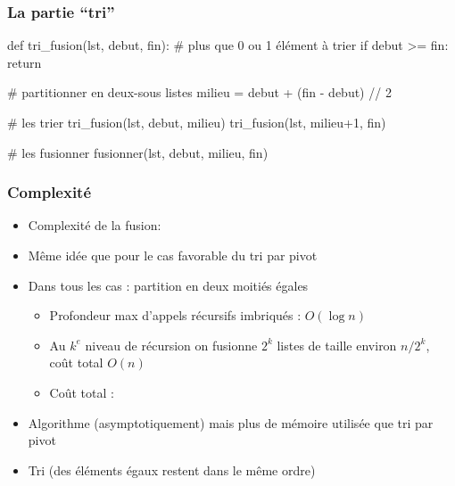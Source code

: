 \documentclass[12pt]{linfo-beamer}
\begin{document}
\begin{frame}[fragile]
\frametitle{La partie ``tri''}

\footnotesize
\begin{pyframe}{}
def tri_fusion(lst, debut, fin):
    # plus que 0 ou 1 élément à trier
    if debut >= fin:
        return

    # partitionner en deux-sous listes
    milieu = debut + (fin - debut) // 2

    # les trier
    tri_fusion(lst, debut, milieu)
    tri_fusion(lst, milieu+1, fin)

    # les fusionner
    fusionner(lst, debut, milieu, fin)
\end{pyframe}

\end{frame}

\begin{frame}
    \frametitle{Complexité}

  \begin{itemize}
  \item Complexité de la fusion: 

    \medskip

  \item Même idée que pour le cas favorable du tri par pivot

    \medskip

  \item Dans tous les cas : partition en deux moitiés égales
    \begin{itemize}
    \item Profondeur max d'appels récursifs imbriqués : $O(\log n)$
    \item Au $k^e$ niveau de récursion on fusionne $2^k$
      listes de taille environ $n / 2^k$, coût total $O(n)$
    \item Coût total : 
    \end{itemize}

  \item Algorithme (asymptotiquement)  mais plus de mémoire
  utilisée que tri par pivot

  \item Tri  (des éléments égaux restent dans le même ordre)
  \end{itemize}
\end{frame}
\end{document}

